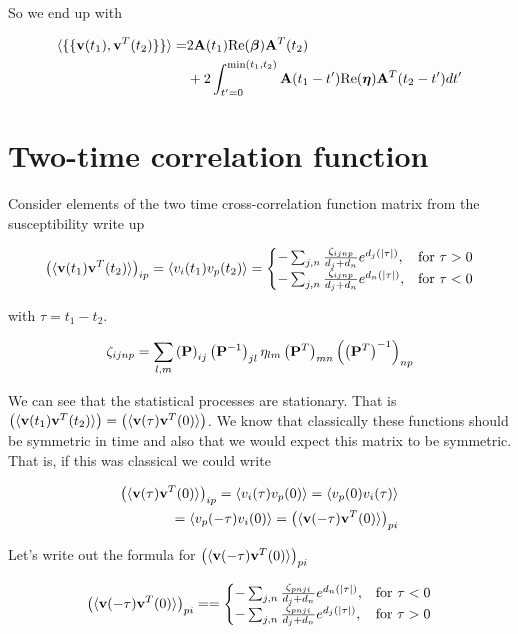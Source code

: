\documentclass[12pt]{article}
\newcommand{\bv}[1]{\bold{#1}}
\begin{document}
So we end up with

\begin{align}
\braket{\{\{\bv{v}(t_1),\bv{v}^T(t_2)\}\}} =& 2 \bv{A}(t_1) \text{Re}(\boldsymbol{\beta}) \bv{A}^T(t_2)\\
&+2 \int_{t'=0}^{\text{min}(t_1,t_2)} \bv{A}(t_1-t')\text{Re}(\boldsymbol{\eta})\bv{A}^T(t_2-t') dt'
\end{align}

\section{Two-time correlation function}
Consider elements of the two time cross-correlation function matrix from the susceptibility write up

\begin{align}
\left(\braket{\bv{v}(t_1)\bv{v}^T(t_2)}\right)_{ip} = \braket{v_i(t_1)v_p(t_2)} =\begin{cases}
-\sum_{j,n} \frac{\zeta_{ijnp}}{d_j+d_n} e^{d_j(|\tau|)}, & \text{for } \tau>0\\
-\sum_{j,n} \frac{\zeta_{ijnp}}{d_j+d_n} e^{d_n(|\tau|)}, & \text{for } \tau<0
\end{cases}
\end{align}

with $\tau = t_1-t_2$.

\begin{align}
\zeta_{ijnp} = \sum_{l,m} \left(\bv{P}\right)_{ij}\left(\bv{P}^{-1}\right)_{jl}\eta_{lm} \left(\bv{P}^T\right)_{mn}\left(\left(\bv{P}^{T}\right)^{-1}\right)_{np}
\end{align}

We can see that the statistical processes are stationary. That is $\left(\braket{\bv{v}(t_1)\bv{v}^T(t_2)}\right)=\left(\braket{\bv{v}(\tau)\bv{v}^T(0)}\right)$. We know that classically these functions should be symmetric in time and also that we would expect this matrix to be symmetric. That is, if this was classical we could write

\begin{align}
\left(\braket{\bv{v}(\tau)\bv{v}^T(0)}\right)_{ip}= \braket{v_i(\tau)v_p(0)} = \braket{v_p(0)v_i(\tau)}\\
=\braket{v_p(-\tau)v_i(0)} = \left(\braket{\bv{v}(-\tau)\bv{v}^T(0)}\right)_{pi}
\end{align}

Let's write out the formula for $\left(\braket{\bv{v}(-\tau)\bv{v}^T(0)}\right)_{pi}$

\begin{align}
\left(\braket{\bv{v}(-\tau)\bv{v}^T(0)}\right)_{pi} = =\begin{cases}
-\sum_{j,n} \frac{\zeta_{pnji}}{d_j+d_n} e^{d_n(|\tau|)}, & \text{for } \tau<0\\
-\sum_{j,n} \frac{\zeta_{pnji}}{d_j+d_n} e^{d_j(|\tau|)}, & \text{for } \tau>0
\end{cases}
\end{align}
\end{document}
